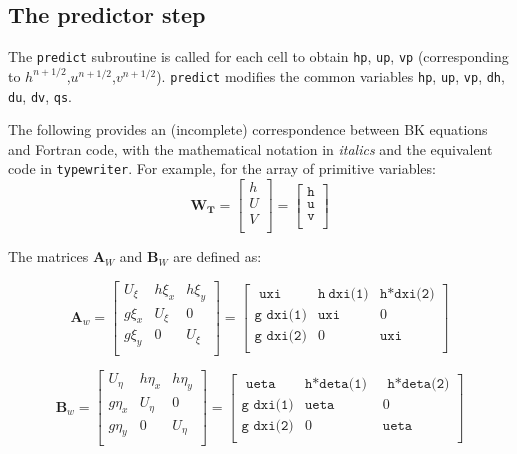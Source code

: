 \documentclass{article}
\newcommand{\code}[1]{\texttt{#1}}
\begin{document}
\subsection{The predictor step}

The \code{predict} subroutine is called for each cell to obtain \code{hp}, \code{up},  \code{vp} (corresponding to $h^{n+1/2}$,$u^{n+1/2}$,$v^{n+1/2}$).   \code{predict}  modifies the common variables  \code{hp}, \code{up},  \code{vp}, \code{dh}, \code{du}, \code{dv}, \code{qs}.


The following provides an (incomplete) correspondence between BK equations and Fortran code, with the mathematical notation in \textit{italics} and the equivalent code in \code{typewriter}.   For example, for the array of primitive variables:
\[  \mathbf{W_T} = 
\begin{bmatrix}
	h \\
	U \\
	V \\
\end{bmatrix}
 =  {
	 \begin{bmatrix}
	 \code{h} \\
	 \code{u} \\	 
	 \code{v} \\	 	 	 
\end{bmatrix} 
}  \]



The matrices $\mathbf{A}_W$ and $\mathbf{B}_W$ are defined as: 

\[ \mathbf{A}_w = 
\begin{bmatrix}
    U_{\xi} & h \xi_x & h \xi_{y} \\
    g \xi_x &    U_{\xi}  & 0    \\
    g \xi_y &   0   & U_{\xi}    \\    
\end{bmatrix} =
\begin{bmatrix}
    \code{ uxi }& \code{h} \ \code{dxi(1)} &\code{h*dxi(2)}\\
    \code{g dxi(1)}& \code{uxi} & 0  \\    
    \code{g dxi(2)}&     0       & \code{uxi}  \\          
\end{bmatrix} 
\]

\[ \mathbf{B}_w = 
\begin{bmatrix}
    U_{\eta} & h \eta_x    & h \eta_{y} \\
    g \eta_x &    U_{\eta}  & 0    \\
    g \eta_y &      0       & U_{\eta}    \\    
\end{bmatrix} =
\begin{bmatrix}
    \code{ ueta }  & \code{h*deta(1) } & \code{ h*deta(2)}\\
    \code{g dxi(1)} & \code{ueta}  & 0  \\    
    \code{g dxi(2)} &     0  	   &  \code{ueta}  \\          
\end{bmatrix} 
\]
\end{document}
